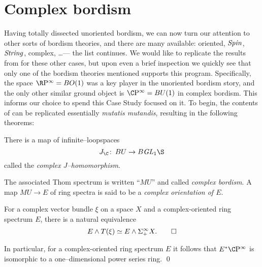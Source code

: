 
\chapter{Complex bordism}\label{ComplexBordismChapter}


Having totally dissected unoriented bordism, we can now turn our attention to other sorts of bordism theories, and there are many available: oriented, $\mathit{Spin}$, $\mathit{String}$, complex, \ldots --- the list continues.  We would like to replicate the results from  for these other cases, but upon even a brief inspection we quickly see that only one of the bordism theories mentioned supports this program.  Specifically, the space $\RP^\infty = BO(1)$ was a key player in the unoriented bordism story, and the only other similar ground object is $\CP^\infty = BU(1)$ in complex bordism.  This informs our choice to spend this Case Study focused on it.  To begin, the contents of  can be replicated essentially \textit{mutatis mutandis}, resulting in the following theorems:

\begin{theorem}
There is a map of infinite--loopspaces \[J_{\C}\co BU \to B \GL_1 \S\] called the \textit{complex $J$--homomorphism}.
\end{theorem}

\begin{definition}
The associated Thom spectrum is written ``$MU$'' and called \textit{complex bordism}.  A map $MU \to E$ of ring spectra is said to be a \textit{complex orientation of $E$}.
\end{definition}

\begin{theorem}\label{ThomIsomOverC}
For a complex vector bundle $\xi$ on a space $X$ and a complex-oriented ring spectrum $E$, there is a natural equivalence \[E \wedge T(\xi) \simeq E \wedge \Sigma^\infty_+ X. \qed\]
\end{theorem}

\begin{corollary}\label{CPinftyNiceCalculation}
In particular, for a complex-oriented ring spectrum $E$ it follows that $E^* \CP^\infty$ is isomorphic to a one--dimensional power series ring. \qed
{}
\end{corollary}

